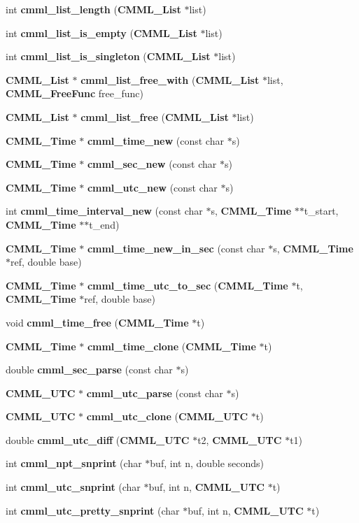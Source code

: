 \begin{CompactItemize}
int {\bf cmml\_\-list\_\-length} ({\bf CMML\_\-List} $\ast$list)
\item 
int {\bf cmml\_\-list\_\-is\_\-empty} ({\bf CMML\_\-List} $\ast$list)
\item 
int {\bf cmml\_\-list\_\-is\_\-singleton} ({\bf CMML\_\-List} $\ast$list)
\item 
{\bf CMML\_\-List} $\ast$ {\bf cmml\_\-list\_\-free\_\-with} ({\bf CMML\_\-List} $\ast$list, {\bf CMML\_\-Free\-Func} free\_\-func)
\item 
{\bf CMML\_\-List} $\ast$ {\bf cmml\_\-list\_\-free} ({\bf CMML\_\-List} $\ast$list)
\item 
{\bf CMML\_\-Time} $\ast$ {\bf cmml\_\-time\_\-new} (const char $\ast$s)
\item 
{\bf CMML\_\-Time} $\ast$ {\bf cmml\_\-sec\_\-new} (const char $\ast$s)
\item 
{\bf CMML\_\-Time} $\ast$ {\bf cmml\_\-utc\_\-new} (const char $\ast$s)
\item 
int {\bf cmml\_\-time\_\-interval\_\-new} (const char $\ast$s, {\bf CMML\_\-Time} $\ast$$\ast$t\_\-start, {\bf CMML\_\-Time} $\ast$$\ast$t\_\-end)
\item 
{\bf CMML\_\-Time} $\ast$ {\bf cmml\_\-time\_\-new\_\-in\_\-sec} (const char $\ast$s, {\bf CMML\_\-Time} $\ast$ref, double base)
\item 
{\bf CMML\_\-Time} $\ast$ {\bf cmml\_\-time\_\-utc\_\-to\_\-sec} ({\bf CMML\_\-Time} $\ast$t, {\bf CMML\_\-Time} $\ast$ref, double base)
\item 
void {\bf cmml\_\-time\_\-free} ({\bf CMML\_\-Time} $\ast$t)
\item 
{\bf CMML\_\-Time} $\ast$ {\bf cmml\_\-time\_\-clone} ({\bf CMML\_\-Time} $\ast$t)
\item 
double {\bf cmml\_\-sec\_\-parse} (const char $\ast$s)
\item 
{\bf CMML\_\-UTC} $\ast$ {\bf cmml\_\-utc\_\-parse} (const char $\ast$s)
\item 
{\bf CMML\_\-UTC} $\ast$ {\bf cmml\_\-utc\_\-clone} ({\bf CMML\_\-UTC} $\ast$t)
\item 
double {\bf cmml\_\-utc\_\-diff} ({\bf CMML\_\-UTC} $\ast$t2, {\bf CMML\_\-UTC} $\ast$t1)
\item 
int {\bf cmml\_\-npt\_\-snprint} (char $\ast$buf, int n, double seconds)
\item 
int {\bf cmml\_\-utc\_\-snprint} (char $\ast$buf, int n, {\bf CMML\_\-UTC} $\ast$t)
\item 
int {\bf cmml\_\-utc\_\-pretty\_\-snprint} (char $\ast$buf, int n, {\bf CMML\_\-UTC} $\ast$t)
\end{CompactItemize}


